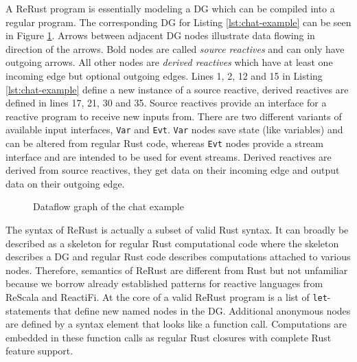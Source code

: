 A \textsf{ReRust} program is essentially modeling a \ac{DG} which can be compiled into a regular program. The corresponding \ac{DG} for Listing \ref{lst:chat-example} can be seen in Figure \ref{fig:graph-chat}. Arrows between adjacent \ac{DG} nodes illustrate data flowing in direction of the arrows. Bold nodes are called \emph{source reactives} and can only have outgoing arrows. All other nodes are \emph{derived reactives} which have at least one incoming edge but optional outgoing edges. Lines 1, 2, 12 and 15 in Listing \ref{lst:chat-example} define a new instance of a source reactive, derived reactives are defined in lines 17, 21, 30 and 35. Source reactives provide an interface for a reactive program to receive new inputs from. There are two different variants of available input interfaces, \lstinline{Var} and \lstinline{Evt}. \lstinline{Var} nodes save state (like variables) and can be altered from regular Rust code, whereas \lstinline{Evt} nodes provide a stream interface and are intended to be used for event streams. Derived reactives are derived from source reactives, they get data on their incoming edge and output data on their outgoing edge.

\begin{figure}[htbp]
    \centering
    \caption{Dataflow graph of the chat example}
    \label{fig:graph-chat}
\end{figure}

The syntax of \textsf{ReRust} is actually a subset of valid Rust syntax. It can broadly be described as a skeleton for regular Rust computational code where the skeleton describes a \ac{DG} and regular Rust code describes computations attached to various nodes. Therefore, semantics of \textsf{ReRust} are different from Rust but not unfamiliar because we borrow already established patterns for reactive languages from \textsf{ReScala} and \textsf{ReactiFi}. At the core of a valid \textsf{ReRust} program is a list of \lstinline{let}-statements that define new named nodes in the \ac{DG}. Additional anonymous nodes are defined by a syntax element that looks like a function call. Computations are embedded in these function calls as regular Rust closures with complete Rust feature support.

